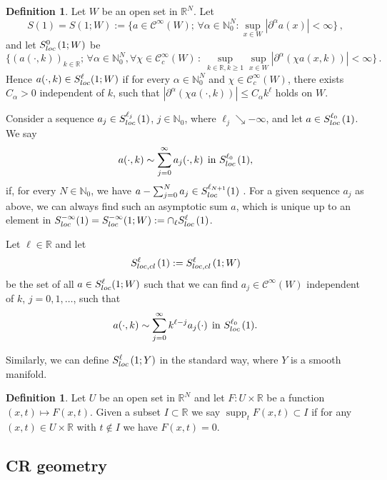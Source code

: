 \documentclass[12pt]{amsart}
\theoremstyle{definition}
\newtheorem{definition}[theorem]{Definition}
\theoremstyle{named}
\numberwithin{equation}{subsection}
\newcommand{\R}{\mathbb{R}}
\newcommand{\N}{\mathbb{N}}
\newcommand{\pr}{\partial}
\newcommand{\abs}[1]{\left\vert#1\right\vert}
\def\cC{\mathscr{C}}
\begin{document}
\begin{definition} \label{d-gue140826}
Let $W$ be an open set in $\mathbb R^N$. Let
\[
S(1)=S(1;W):=\Big\{a\in\cC^\infty(W);\, \forall\alpha\in\mathbb N^N_0:
\sup_{x\in W}\abs{\pr^\alpha a(x)}<\infty\Big\}\,,\]
and let $S^0_{{\rm loc\,}}(1;W)$ be
\[\Big\{(a(\cdot,k))_{k\in\mathbb R};\,\forall\alpha\in\mathbb N^N_0,
\forall \chi\in \cC^\infty_c(W)\,:\:\sup_{k\in\mathbb R, k\geq1}\sup_{x\in W}\abs{\pr^\alpha(\chi a(x,k))}<\infty\Big\}\,.
\]
Hence $a(\cdot,k)\in S^\ell_{{\rm loc}}(1;W)$ if for every $\alpha\in\mathbb N^N_0$ and $\chi\in\cC^\infty_c(W)$, there
exists $C_\alpha>0$ independent of $k$, such that $\abs{\pr^\alpha (\chi a(\cdot,k))}\leq C_\alpha k^{\ell}$ holds on $W$.

Consider a sequence $a_j\in S^{\ell_j}_{{\rm loc\,}}(1)$, $j\in\N_0$, where $\ell_j\searrow-\infty$,
and let $a\in S^{\ell_0}_{{\rm loc\,}}(1)$. We say
\[
a(\cdot,k)\sim
\sum\limits^\infty_{j=0}a_j(\cdot,k)\:\:\text{in $S^{\ell_0}_{{\rm loc\,}}(1)$},
\]
if, for every
$N\in\N_0$, we have $a-\sum^{N}_{j=0}a_j\in S^{\ell_{N+1}}_{{\rm loc\,}}(1)$ .
For a given sequence $a_j$ as above, we can always find such an asymptotic sum
$a$, which is unique up to an element in
$S^{-\infty}_{{\rm loc\,}}(1)=S^{-\infty}_{{\rm loc\,}}(1;W):=\cap _\ell S^\ell_{{\rm loc\,}}(1)$.


Let $\ell\in\mathbb R$ and let
\[
S^\ell_{{\rm loc},{\rm cl\,}}(1):=S^\ell_{{\rm loc},{\rm cl\,}}(1;W)
\] be the set of all $a\in S^\ell_{{\rm loc}}(1;W)$ such that we can find $a_j\in\cC^\infty(W)$ independent of $k$, $j=0,1,\ldots$,  such that 
\[
a(\cdot,k)\sim
\sum\limits^\infty_{j=0}k^{\ell-j}a_j(\cdot)\:\:\text{in $S^{\ell_0}_{{\rm loc\,}}(1)$}.
\]

Similarly, we can define $S^\ell_{{\rm loc\,}}(1;Y)$ in the standard way, where $Y$ is a smooth manifold.
\end{definition}
\begin{definition}\label{def:suppt}
	Let \(U\) be an open set in \(\R^N\) and let \(F\colon U\times \R\) be a function \((x,t)\mapsto F(x,t)\). Given a subset \(I\subset \R\) we say \(\operatorname{supp}_tF(x,t)\subset I\) if for any \((x,t)\in U\times \R\) with \(t\notin I\) we have \(F(x,t)=0\).
\end{definition}
\subsection{CR geometry}\label{s-gue241119ycd}
\end{document}
